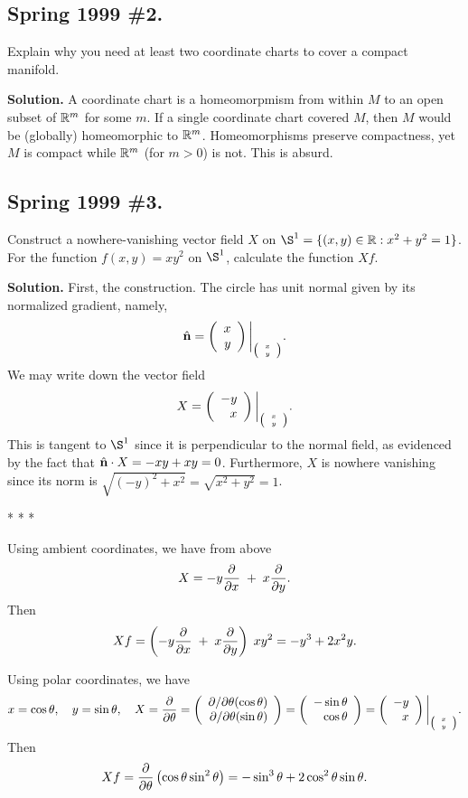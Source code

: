 \documentclass[10pt]{article}
\numberwithin{equation}{subsection}
\begin{document}
\subsection{Spring 1999 \#2.}

Explain why you need at least two coordinate charts to cover a compact
manifold.

\textbf{Solution.}  A coordinate chart is a homeomorpmism from within $M$ to an
open subset of $\mathbb{R}^m$ for some $m$.  If a single coordinate chart covered $M$,
then $M$ would be (globally) homeomorphic to $\mathbb{R}^m$.  Homeomorphisms preserve
compactness, yet $M$ is compact while $\mathbb{R}^m$ (for $m>0$) is not.  This is
absurd.

\subsection{Spring 1999 \#3.}

Construct a nowhere-vanishing vector field $X$ on $\S^1 = \{(x,y)\in
\R:x^2+y^2=1\}$.  For the function $f(x,y)=xy^2$ on $\S^1$, calculate the
function $Xf$.

\textbf{Solution.} First, the construction.  The circle has unit normal given
by its normalized gradient, namely,
$$
	\hat{\mathbf{n}} = \left(\begin{array}{r} x \\ y \end{array}\right)\bigg|_{\tiny{\left(\begin{array}{r} x \\ y \end{array}\right)}}.
$$
We may write down the vector field
$$
	X = \left(\begin{array}{r} -y \\ x \end{array}\right)\bigg|_{\tiny{\left(\begin{array}{r} x \\ y \end{array}\right)}}.
$$
This is tangent to $\S^1$ since it is perpendicular to the normal field, as
evidenced by the fact that $\hat{\mathbf{n}} \cdot X = -xy+xy=0$.  Furthermore, $X$ is
nowhere vanishing since its norm is $\sqrt{(-y)^2+x^2}=\sqrt{x^2+y^2}=1$.

\begin{center}* * *\end{center}

Using ambient coordinates, we have from above
$$
	X = -y \frac{\partial}{\partial x} \;+\; x \frac{\partial}{\partial y}.
$$
Then
$$
	Xf = \left(-y \frac{\partial}{\partial x} \;+\; x \frac{\partial}{\partial y}\right)\; xy^2
	= -y^3 + 2x^2y.
$$

Using polar coordinates, we have
$$
	x = \cos\theta,\quad
	y = \sin\theta,\quad
	X = \frac{\partial}{\partial \theta} = \left(\begin{array}{r} \partial/\partial \theta(\cos\theta) \\ \partial/\partial \theta(\sin\theta) \end{array}\right)
	= \left(\begin{array}{r} -\sin\theta \\ \cos\theta \end{array}\right)
	= \left(\begin{array}{r} -y \\ x \end{array}\right)\bigg|_{\tiny{\left(\begin{array}{r} x \\ y \end{array}\right)}}.
$$
Then
$$
	Xf = \frac{\partial}{\partial \theta}\left(\cos\theta\sin^2\theta\right)
	= -\sin^3\theta + 2\cos^2\theta\sin\theta.
$$

\end{document}
